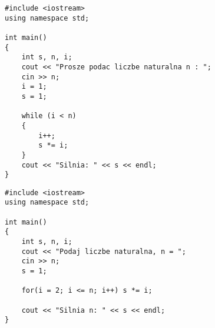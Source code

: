 \documentclass[a4paper,11pt]{article}
\begin{document}
	
	

\begin{lstlisting}[caption=Obliczanie silni, captionpos=b,
label=src:passive2,frame=single]
#include <iostream>
using namespace std;

int main()
{
	int s, n, i;
	cout << "Prosze podac liczbe naturalna n : ";
	cin >> n;
	i = 1;
	s = 1;

	while (i < n)
	{
		i++;
		s *= i;
	}
	cout << "Silnia: " << s << endl;
}

\end{lstlisting}

\begin{lstlisting}[caption=Obliczanie silni, captionpos=b,
label=src:passive2,frame=single]
#include <iostream>
using namespace std;

int main()
{
	int s, n, i;  
	cout << "Podaj liczbe naturalna, n = ";
	cin >> n;
	s = 1;  

	for(i = 2; i <= n; i++) s *= i;  

	cout << "Silnia n: " << s << endl;
}

\end{lstlisting}
\end{document}

